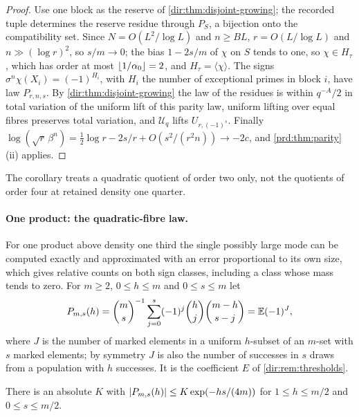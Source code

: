 \begin{proof}
Use one block as the reserve of \cref{dir:thm:disjoint-growing}; the recorded tuple determines the reserve residue
through $P_S$, a bijection onto the compatibility set. Since $N=O(L^2/\log L)$ and $n\ge BL$, $r=O(L/\log L)$ and
$n\gg(\log r)^2$, so $s/m\to0$; the bias $1-2s/m$ of $\chi$ on $S$ tends to one, so $\chi\in H_\tau$, which has order at
most $\lfloor1/\alpha_0\rfloor=2$, and $H_\tau=\langle\chi\rangle$. The signs $\sigma^n\chi(X_i)=(-1)^{H_i}$, with $H_i$ the
number of exceptional primes in block $i$, have law $P_{r,n,s}$. By \cref{dir:thm:disjoint-growing} the law of the
residues is within $q^{-A}/2$ in total variation of the uniform lift of this parity law, uniform lifting over
equal fibres preserves total variation, and $\mathcal U_q$ lifts $U_{r,(-1)^s}$. Finally
$\log(\sqrt r\,\beta^n)=\frac12\log r-2s/r+O(s^2/(r^2n))\to-2c$, and \cref{prd:thm:parity}(ii) applies.
\end{proof}

The corollary treats a quadratic quotient of order two only, not the quotients of order four at retained density
one quarter.

\paragraph{One product: the quadratic-fibre law.}
For one product above density one third the single possibly large mode can be computed exactly and
approximated with an error proportional to its own size, which gives relative counts on both sign
classes, including a class whose mass tends to zero. For $m\ge2$, $0\le h\le m$ and $0\le s\le m$ let
\[
 P_{m,s}(h)=\binom ms^{-1}\sum_{j=0}^s(-1)^j\binom hj\binom{m-h}{s-j}=\mathbb{E}(-1)^J,
\]
where $J$ is the number of marked elements in a uniform $h$-subset of an $m$-set with $s$ marked
elements; by symmetry $J$ is also the number of successes in $s$ draws from a population with $h$
successes. It is the coefficient $E$ of \cref{dir:rem:thresholds}.

\begin{lemma}\label{dir:lem:paritydecay}
There is an absolute $K$ with $\lvert P_{m,s}(h)\rvert\le K\exp(-hs/(4m))$ for $1\le h\le m/2$ and $0\le s\le m/2$.
\end{lemma}

